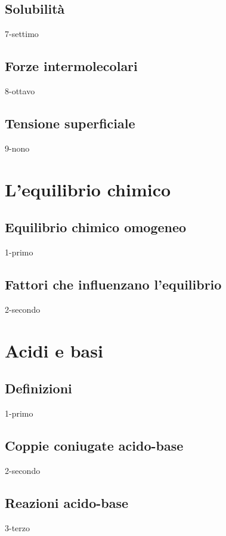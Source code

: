 \documentclass[openany,12pt]{book}%
\begin{document}
  \section{Solubilità}
    {7-settimo}

    \newpage

  \section{Forze intermolecolari}
    {8-ottavo}

  \section{Tensione superficiale}
    {9-nono}

\chapter{L'equilibrio chimico}

  \section{Equilibrio chimico omogeneo}
    {1-primo}

  \section{Fattori che influenzano l'equilibrio}
    {2-secondo}

\chapter{Acidi e basi}

  \section{Definizioni}
    {1-primo}

  \section{Coppie coniugate acido-base}
    {2-secondo}

  \section{Reazioni acido-base}
    {3-terzo}
\end{document}
